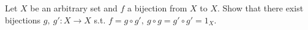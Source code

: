Let \(X\) be an arbitrary set and \(f\) a bijection from \(X\) to \(X\). Show that there exist bijections \(g,\ g'\colon X\to X\) s.t. \(f=g\circ g',\ g\circ g=g'\circ g'=1_X\).